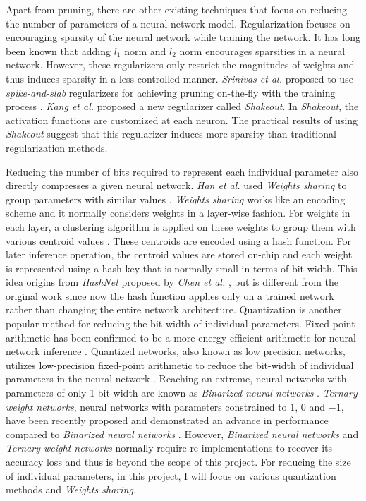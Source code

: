 \documentclass[a4paper,12pt]{report}
\begin{document}
Apart from pruning, there are other existing techniques that focus on
reducing the number of parameters of a neural network model.
Regularization focuses on encouraging sparsity of the neural network while training
the network.
It has long been known that adding $l_1$ norm and $l_2$ norm encourages
sparsities in a neural network.
However, these regularizers only restrict the magnitudes of weights and thus
induces sparsity in a less controlled manner.
\textit{Srinivas et al.} proposed to use \textit{spike-and-slab} regularizers
for achieving pruning on-the-fly with the training process \cite{Srinivas2015}.
\textit{Kang et al.} proposed a new regularizer called \textit{Shakeout}.
In \textit{Shakeout}, the activation functions are customized at each neuron.
The practical results of using \textit{Shakeout} suggest that this regularizer
induces more sparsity than traditional regularization methods.

Reducing the number of bits required to represent each individual parameter also
directly compresses a given neural network.
\textit{Han et al.} used \textit{Weights sharing} to group parameters with similar values \cite{Han15}.
\textit{Weights sharing} works like an encoding scheme and it normally considers weights in a layer-wise fashion.
For weights in each layer, a clustering algorithm is applied on these
weights to group them with various centroid values \cite{Han15}.
These centroids are encoded using a hash function.
For later inference operation, the centroid values are stored on-chip and
each weight is represented using a hash key that is normally small in terms of
bit-width.
This idea origins from \textit{HashNet} proposed by \textit{Chen et al.} \cite{chen2015compressing},
but is different from the original work since now the hash function
applies only on a trained network rather than changing the entire network architecture.
Quantization is another popular method for reducing the bit-width of individual parameters.
Fixed-point arithmetic has been confirmed to be a more energy efficient arithmetic
for neural network inference \cite{moons2016energy}.
Quantized networks, also known as low precision networks, utilizes low-precision
fixed-point arithmetic to reduce the bit-width of individual parameters in the
neural network \cite{Hubara}.
Reaching an extreme, neural networks with parameters of only 1-bit width are
known as \textit{Binarized neural networks} \cite{Courbariaux}.
\textit{Ternary weight networks}, neural networks with parameters constrained to
$1$, $0$ and $-1$, have been recently proposed and demonstrated an advance in
performance compared to  \textit{Binarized neural networks} \cite{li2016ternary}.
However, \textit{Binarized neural networks} and \textit{Ternary weight networks} normally require re-implementations to recover
its accuracy loss and thus is beyond the scope of this project.
For reducing the size of individual parameters, in this project, I will focus on
various quantization methods and \textit{Weights sharing}.
\end{document}

